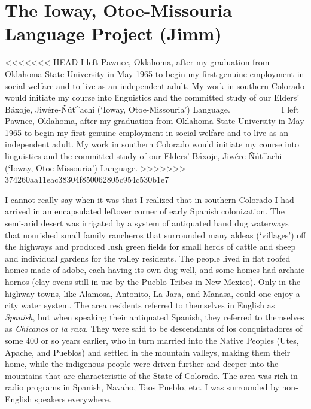 \documentclass[output=paper]{LSP/langsci}
\begin{document}
\section{The Ioway, Otoe-Missouria Language Project (Jimm)}
<<<<<<< HEAD
I left Pawnee, Oklahoma, after my graduation from Oklahoma State University in May 1965 to begin my first genuine employment in social welfare and to live as an independent adult. My work in southern Colorado would initiate my course into linguistics and the committed study of our Elders' Báxoje, Jiw\'ere-\~N\'ut\^{ }achi (`Ioway, Otoe-Mis\-sou\-ria') Language.
=======
I left Pawnee, Oklahoma, after my graduation from Oklahoma State University in May 1965 to begin my first genuine employment in social welfare and to live as an independent adult. My work in southern Colorado would initiate my course into linguistics and the committed study of our Elders' B\'axoje, Jiw\'ere-\~N\'ut\^{ }achi (`Ioway, Otoe-Mis\-sou\-ria') Language.
>>>>>>> 374260aa11eac38304f850062805c954c530b1e7

I cannot really say when it was that I realized that in southern Colorado I had arrived in an encapsulated leftover corner of early Spanish colonization. The semi-arid desert was irrigated by a system of antiquated hand dug waterways that nourished small family rancheros that surrounded many aldeas (`villages') off the highways and produced lush green fields for small herds of cattle and sheep and individual gardens for the valley residents. The people lived in flat roofed homes made of adobe, each having its own dug well, and some homes had archaic hornos (clay ovens still in use by the Pueblo Tribes in New Mexico). Only in the highway towns, like Alamosa, Antonito, La Jara, and Manasa, could one enjoy a city water system. The area residents referred to themselves in English as \emph{Spanish}, but when speaking their antiquated Spanish, they referred to themselves as \emph{Chicanos} or \emph{la raza}. They were said to be descendants of los conquistadores of some 400 or so years earlier, who in turn married into the Native Peoples (Utes, Apache, and Pueblos) and settled in the mountain valleys, making them their home, while the indigenous people were driven further and deeper into the mountains that are characteristic of the State of Colorado. The area was rich in radio programs in Spanish, Navaho, Taos Pueblo, etc. I was surrounded by non-English speakers everywhere.
\end{document}
